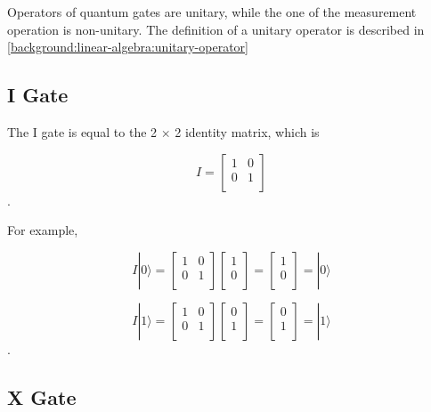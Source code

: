 Operators of quantum gates are unitary, while the one of the measurement operation is non-unitary.
The definition of a unitary operator is described in \ref{background:linear-algebra:unitary-operator}
\subsection{I Gate}

The I gate is equal to the 2 $\times$ 2 identity matrix, which is 

\begin{equation}
I = \begin{bmatrix}
1 & 0 \\
0 & 1 \\
\end{bmatrix}
\end{equation}.

For example,

\begin{equation}
 I|0\rangle = \begin{bmatrix}
1 & 0 \\
0 & 1 \\
\end{bmatrix} 
\left[
\begin{array}{c}
1 \\
0 \\
\end{array}
\right]
= \left[
\begin{array}{c}
1 \\
0 \\
\end{array}
\right]
= |0\rangle
\end{equation}

\begin{equation}
I|1\rangle = \begin{bmatrix}
1 & 0 \\
0 & 1 \\
\end{bmatrix} 
\left[
\begin{array}{c}
0 \\
1  \\
\end{array}
\right]
= \left[
\begin{array}{c}
0 \\
1 \\
\end{array}
\right]
= |1\rangle
\end{equation}.

\subsection{X Gate}
